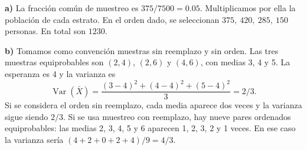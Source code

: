 \textbf{a)} La fracción común de muestreo es $375/7500=0.05$.
Multiplicamos por ella la población de cada estrato. En el
orden dado, se seleccionan $\boxed{375,\ 420,\ 285,\ 150}$
personas. En total son $\boxed{1230}$.

\textbf{b)} Tomamos como convención muestras sin reemplazo
y sin orden. Las tres muestras equiprobables son $(2,4)$,
$(2,6)$ y $(4,6)$, con medias 3, 4 y 5. La esperanza es 4 y
la varianza es
\[
\operatorname{Var}(\bar X)=\frac{(3-4)^2+(4-4)^2+(5-4)^2}{3}
=\boxed{2/3}.
\]
Si se considera el orden sin reemplazo, cada media aparece
dos veces y la varianza sigue siendo $2/3$. Si se usa
muestreo con reemplazo, hay nueve pares ordenados equiprobables:
las medias 2, 3, 4, 5 y 6 aparecen 1, 2, 3, 2 y 1 veces.
En ese caso la varianza sería $(4+2+0+2+4)/9=\boxed{4/3}$.
